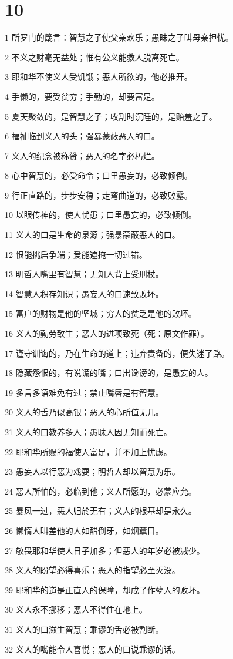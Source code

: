 \chapter{10}

\par 1 所罗门的箴言：智慧之子使父亲欢乐；愚昧之子叫母亲担忧。
\par 2 不义之财毫无益处；惟有公义能救人脱离死亡。
\par 3 耶和华不使义人受饥饿；恶人所欲的，他必推开。
\par 4 手懒的，要受贫穷；手勤的，却要富足。
\par 5 夏天聚敛的，是智慧之子；收割时沉睡的，是贻羞之子。
\par 6 福祉临到义人的头；强暴蒙蔽恶人的口。
\par 7 义人的纪念被称赞；恶人的名字必朽烂。
\par 8 心中智慧的，必受命令；口里愚妄的，必致倾倒。
\par 9 行正直路的，步步安稳；走弯曲道的，必致败露。
\par 10 以眼传神的，使人忧患；口里愚妄的，必致倾倒。
\par 11 义人的口是生命的泉源；强暴蒙蔽恶人的口。
\par 12 恨能挑启争端；爱能遮掩一切过错。
\par 13 明哲人嘴里有智慧；无知人背上受刑杖。
\par 14 智慧人积存知识；愚妄人的口速致败坏。
\par 15 富户的财物是他的坚城；穷人的贫乏是他的败坏。
\par 16 义人的勤劳致生；恶人的进项致死（死：原文作罪）。
\par 17 谨守训诲的，乃在生命的道上；违弃责备的，便失迷了路。
\par 18 隐藏怨恨的，有说谎的嘴；口出谗谤的，是愚妄的人。
\par 19 多言多语难免有过；禁止嘴唇是有智慧。
\par 20 义人的舌乃似高银；恶人的心所值无几。
\par 21 义人的口教养多人；愚昧人因无知而死亡。
\par 22 耶和华所赐的福使人富足，并不加上忧虑。
\par 23 愚妄人以行恶为戏耍；明哲人却以智慧为乐。
\par 24 恶人所怕的，必临到他；义人所愿的，必蒙应允。
\par 25 暴风一过，恶人归於无有；义人的根基却是永久。
\par 26 懒惰人叫差他的人如醋倒牙，如烟薰目。
\par 27 敬畏耶和华使人日子加多；但恶人的年岁必被减少。
\par 28 义人的盼望必得喜乐；恶人的指望必至灭没。
\par 29 耶和华的道是正直人的保障，却成了作孽人的败坏。
\par 30 义人永不挪移；恶人不得住在地上。
\par 31 义人的口滋生智慧；乖谬的舌必被割断。
\par 32 义人的嘴能令人喜悦；恶人的口说乖谬的话。

